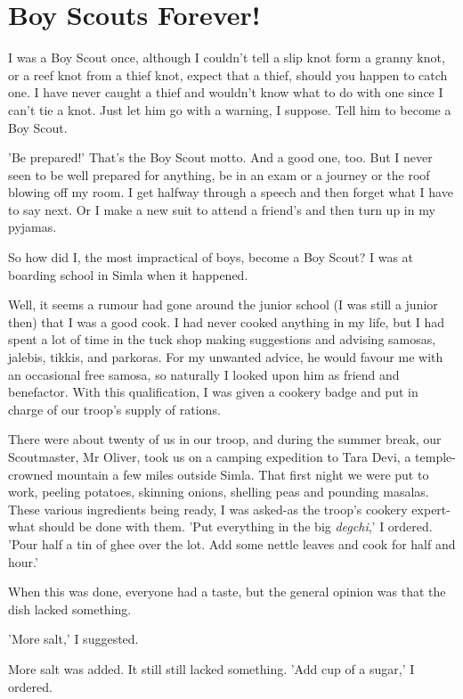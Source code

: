 \chapter{Boy Scouts Forever!}
I was a Boy Scout once, although I couldn't tell a slip knot form a granny knot, or a reef knot from a thief knot, expect that a thief, should you happen to catch one. I have never caught a thief and wouldn't know what to do with one since I can't tie a knot. Just let him go with a warning, I suppose. Tell him to become a Boy Scout.
\par
'Be prepared!' That's the Boy Scout motto. And a good one, too. But I never seen to be well prepared for anything, be in an exam or a journey or the roof blowing off my room. I get halfway through a speech and then forget what I have to say next. Or I make a new suit to attend a friend's and then turn up in my pyjamas.
\par
So how did I, the most impractical of boys, become a Boy Scout? I was at boarding school in Simla when it happened.
\par
Well, it seems a rumour had gone around the junior school (I was still a junior then) that I was a good cook. I had never cooked anything in my life, but I had spent a lot of time in the tuck shop making suggestions and advising samosas, jalebis, tikkis, and parkoras. For my unwanted advice, he would favour me with an occasional free samosa, so naturally I looked upon him as friend and benefactor. With this qualification, I was given a cookery badge and put in charge of our troop's supply of rations.
\par
There were about twenty of us in our troop, and during the summer break, our Scoutmaster, Mr Oliver, took us on a camping expedition to Tara Devi, a temple-crowned mountain a few miles outside Simla. That first night we were put to work, peeling potatoes, skinning onions, shelling peas and pounding masalas. These various ingredients being ready, I was asked-as the troop's cookery expert-what should be done with them. 'Put everything in the big \textit{degchi},' I ordered. 'Pour half a tin of ghee over the lot. Add some nettle leaves and cook for half and hour.'
\par
When this was done, everyone had a taste, but the general opinion was that the dish lacked something.
\par
'More salt,' I suggested.
\par
More salt was added. It still still lacked something. 'Add cup of a sugar,' I ordered.
\par

